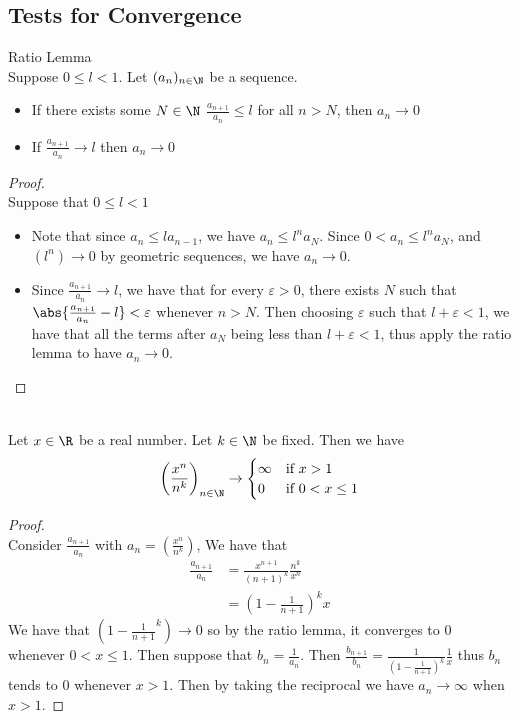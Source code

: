 \documentclass[a4paper]{article}
\begin{document}
\subsection{Tests for Convergence}
\begin{thm}{Ratio Lemma}{}\\ Suppose $0\leq l<1$. Let $(a_n)_{n\in\N}$ be a sequence. 
\begin{itemize}
\item If there exists some $N\in\N$ $\frac{a_{n+1}}{a_n}\leq l$ for all $n>N$, then $a_n\to 0$
\item If $\frac{a_{n+1}}{a_n}\to l$ then $a_n\to0$
\end{itemize}
\begin{proof}\\ Suppose that $0\leq l<1$
\begin{itemize}
\item Note that since $a_n\leq la_{n-1}$, we have $a_n\leq l^na_N$. Since $0<a_n\leq l^na_N$, and $(l^n)\to 0$ by geometric sequences, we have $a_n\to 0$. 
\item Since $\frac{a_{n+1}}{a_n}\to l$, we have that for every $\varepsilon>0$, there exists $N$ such that $\abs{\frac{a_{n+1}}{a_n}-l}<\varepsilon$ whenever $n>N$. Then choosing $\varepsilon$ such that $l+\varepsilon<1$, we have that all the terms after $a_N$ being less than $l+\varepsilon<1$, thus apply the ratio lemma to have $a_n\to 0$. 
\end{itemize}
\end{proof}
\end{thm}

\begin{eg}{}{}\\
Let $x\in\R$ be a real number. Let $k\in\N$ be fixed. Then we have 
$$\left(\frac{x^n}{n^k}\right)_{n\in\N}\to\begin{cases}
\infty & \text{if $x>1$} \\
0 & \text{if $0<x\leq1$} 
\end{cases}$$
\begin{proof}\\ Consider $\frac{a_{n+1}}{a_n}$ with $a_n=\left(\frac{x^n}{n^k}\right)$, We have that 
\begin{align*}
\frac{a_{n+1}}{a_n}&=\frac{x^{n+1}}{(n+1)^k}\frac{n^k}{x^n} \\
&=\left(1-\frac{1}{n+1}\right)^kx
\end{align*}
We have that $\left(1-\frac{1}{n+1}^k\right)\to 0$ so by the ratio lemma, it converges to $0$ whenever $0<x\leq1$. Then suppose that $b_n=\frac{1}{a_n}$. Then $\frac{b_{n+1}}{b_n}=\frac{1}{\left(1-\frac{1}{n+1}\right)^k}\frac{1}{x}$ thus $b_n$ tends to $0$ whenever $x>1$. Then by taking the reciprocal we have $a_n\to\infty$ when $x>1$. 
\end{proof}
\end{eg}
\end{document}
